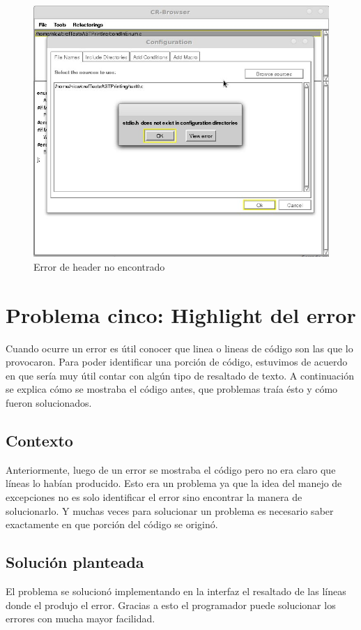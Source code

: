 \documentclass[a4paper,oneside,10pt]{article}
\begin{document}
\begin{figure}[h!]
  \centering
    \includegraphics[scale=0.50]{images/codigo_modificado/error_header_no_encontrado.jpg}
     \caption{Error de header no encontrado}
\end{figure}

\section{Problema cinco: Highlight del error}

Cuando ocurre un error es útil conocer que linea o lineas de código son las que lo provocaron. Para poder identificar una porción de código, estuvimos de acuerdo en que sería muy útil contar con algún tipo de resaltado de texto. A continuación se explica cómo se mostraba el código antes, que problemas traía ésto y cómo fueron solucionados.

\subsection{Contexto}
Anteriormente, luego de un error se mostraba el c\'odigo pero no era claro que l\'ineas lo hab\'ian producido. Esto era un problema ya que la idea del manejo de excepciones no es solo identificar el error sino encontrar la manera de solucionarlo. Y muchas veces para solucionar un problema es necesario saber exactamente en que porci\'on del c\'odigo se origin\'o.

\subsection{Soluci\'on planteada}
El problema se solucion\'o implementando en la interfaz el resaltado de las l\'ineas donde el produjo el error. Gracias a esto el programador puede solucionar los errores con mucha mayor facilidad.
\end{document}
